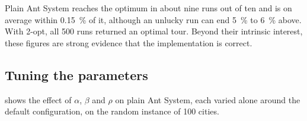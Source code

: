 \documentclass[11pt,a4paper]{article}
\begin{document}
Plain Ant System reaches the optimum in about nine runs out of ten and is on average
within \SI{0.15}{\percent} of it, although an unlucky run can end
\SI{5}{\percent} to \SI{6}{\percent} above. With 2-opt, all 500 runs returned an optimal
tour. Beyond their intrinsic interest, these figures are strong evidence that the
implementation is correct.

\subsection{Tuning the parameters}
\label{sec:tuning}

 shows the effect of $\alpha$, $\beta$ and $\rho$ on plain Ant
System, each varied alone around the default configuration, on the random instance of 100
cities.
\end{document}
